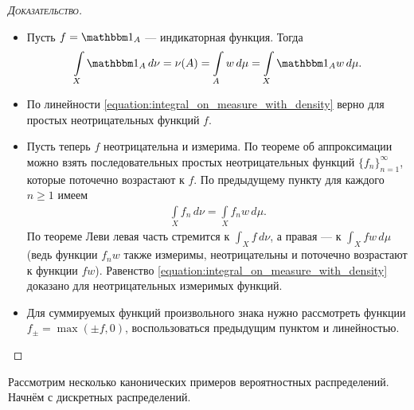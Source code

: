 \documentclass[../main.tex]{subfiles}
\begin{document}
\begin{proof}[\normalfont\textsc{Доказательство}]\
 \begin{itemize}
  \item Пусть $ f = \Ind_A $ --- индикаторная функция. Тогда
   \begin{align*}
		 \int\limits_{X} \Ind_A \, d\nu = \nu(A) = \int\limits_{A} w\,d\mu = \int\limits_{X} \Ind_A w\,d\mu.    
   \end{align*} 
  \item По линейности \eqref{equation:integral_on_measure_with_density} верно для простых неотрицательных функций $ f $.
  \item Пусть теперь $ f $ неотрицательна и измерима. По теореме об аппроксимации можно взять последовательных простых неотрицательных функций $\{f_{n}\}_{n=1}^{\infty} $, которые поточечно возрастают к $ f $. По предыдущему пункту для каждого $ n \geqslant 1 $ имеем
   \begin{align*}
    \int\limits_{X} f_n \,d\nu = \int\limits_{X} f_n w \, d\mu.  
   \end{align*} По теореме Леви левая часть стремится к $ \int_{X} f\,d\nu  $, а правая --- к $ \int_{X} fw\,d\mu $ (ведь функции $ f_n w $ также измеримы, неотрицательны и поточечно возрастают к функции $ fw $). Равенство \eqref{equation:integral_on_measure_with_density} доказано для неотрицательных измеримых функций.

  \item Для суммируемых функций произвольного знака нужно рассмотреть функции $ f_\pm = \max(\pm f, 0) $, воспользоваться предыдущим пунктом и линейностью.
 \end{itemize}
\end{proof}

Рассмотрим несколько канонических примеров вероятностных распределений. Начнём с дискретных распределений.
\end{document}
